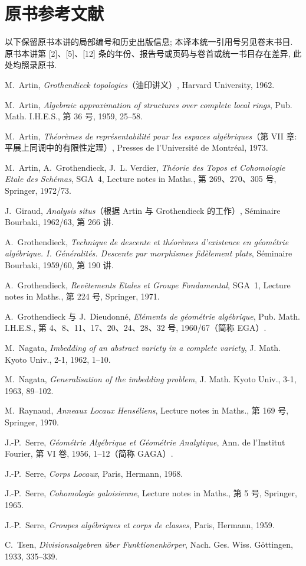 \section*{原书参考文献}
\begingroup\small\raggedright
\noindent 以下保留原书本讲的局部编号和历史出版信息; 本译本统一引用号另见卷末书目. 原书本讲第 [2]、[5]、[12] 条的年份、报告号或页码与卷首或统一书目存在差异, 此处均照录原书.
\begin{enumerate}[{[1]}]
\item M.~Artin, \emph{Grothendieck topologies}（油印讲义）, Harvard University, 1962.
\item M.~Artin, \emph{Algebraic approximation of structures over complete local rings}, Pub. Math. I.H.E.S., 第 36 号, 1959, 25--58.
\item M.~Artin, \emph{Théorèmes de représentabilité pour les espaces algébriques}（第 VII 章: 平展上同调中的有限性定理）, Presses de l'Université de Montréal, 1973.
\item M.~Artin, A.~Grothendieck, J.~L. Verdier, \emph{Théorie des Topos et Cohomologie Etale des Schémas}, SGA~4, Lecture notes in Maths., 第 269、270、305 号, Springer, 1972/73.
\item J.~Giraud, \emph{Analysis situs}（根据 Artin 与 Grothendieck 的工作）, Séminaire Bourbaki, 1962/63, 第 266 讲.
\item A.~Grothendieck, \emph{Technique de descente et théorèmes d'existence en géométrie algébrique. I. Généralités. Descente par morphismes fidèlement plats}, Séminaire Bourbaki, 1959/60, 第 190 讲.
\item A.~Grothendieck, \emph{Revêtements Etales et Groupe Fondamental}, SGA~1, Lecture notes in Maths., 第 224 号, Springer, 1971.
\item A.~Grothendieck 与 J.~Dieudonné, \emph{Eléments de géométrie algébrique}, Pub. Math. I.H.E.S., 第 4、8、11、17、20、24、28、32 号, 1960/67（简称 EGA）.
\item M.~Nagata, \emph{Imbedding of an abstract variety in a complete variety}, J. Math. Kyoto Univ., 2-1, 1962, 1--10.
\item M.~Nagata, \emph{Generalisation of the imbedding problem}, J. Math. Kyoto Univ., 3-1, 1963, 89--102.
\item M.~Raynaud, \emph{Anneaux Locaux Henséliens}, Lecture notes in Maths., 第 169 号, Springer, 1970.
\item J.-P.~Serre, \emph{Géométrie Algébrique et Géométrie Analytique}, Ann. de l'Institut Fourier, 第 VI 卷, 1956, 1--12（简称 GAGA）.
\item J.-P.~Serre, \emph{Corps Locaux}, Paris, Hermann, 1968.
\item J.-P.~Serre, \emph{Cohomologie galoisienne}, Lecture notes in Maths., 第 5 号, Springer, 1965.
\item J.-P.~Serre, \emph{Groupes algébriques et corps de classes}, Paris, Hermann, 1959.
\item C.~Tsen, \emph{Divisionsalgebren über Funktionenkörper}, Nach. Ges. Wiss. Göttingen, 1933, 335--339.
\end{enumerate}
\endgroup

